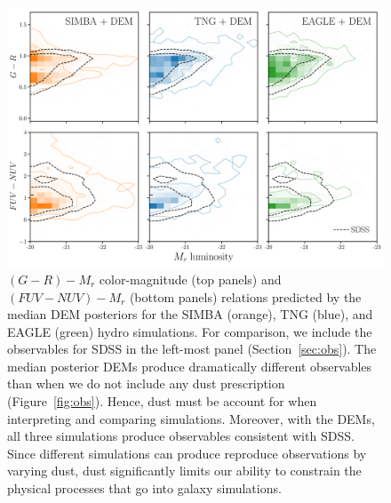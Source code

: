 \begin{figure}
\begin{center}
    \includegraphics[width=\textwidth]{figs/abc_observables.pdf}
    \caption{\label{fig:dem}
    $(G-R) - M_r$ color-magnitude (top panels) and $(FUV-NUV) - M_r$ (bottom
    panels) relations predicted by the median DEM posteriors for the SIMBA
    (orange), TNG (blue), and EAGLE (green) hydro simulations. For comparison, 
    we include the observables for SDSS in the left-most panel
    (Section~\ref{sec:obs}). The median posterior DEMs produce dramatically 
    different observables than when we do not include any dust prescription
    (Figure~\ref{fig:obs}). Hence, dust must be account for when interpreting 
    and comparing simulations. Moreover, with the DEMs, all three simulations
    produce observables consistent with SDSS. Since different simulations can 
    produce reproduce observations by varying dust, dust significantly limits
    our ability to constrain the physical processes that go into galaxy
    simulations. 
    }
\end{center}
\end{figure}


